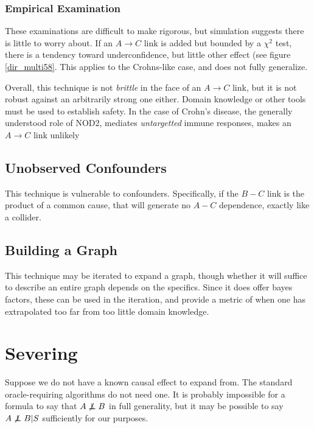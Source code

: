 \documentclass[twocolumn,12pt]{article}
\newcommand\indep{\protect\mathpalette{\protect\independenT}{\perp}}
\def\independenT#1#2{\mathrel{\rlap{$#1#2$}\mkern2mu{#1#2}}}
\begin{document}
\subsubsection{Empirical Examination}

These examinations are difficult to make rigorous, but simulation
suggests there is little to worry about.  If an $A\rightarrow C$ link
is added but bounded by a $\chi^2$ test, there is a tendency toward
underconfidence, but little other effect (see figure
\ref{dir_multi58}.  This applies to the Crohns-like case, and does not
fully generalize.

Overall, this technique is not \textit{brittle} in the face of an
$A \rightarrow C$ link, but it is not robust against an arbitrarily
strong one either.  Domain knowledge or other tools must be used to
establish safety.  In the case of Crohn's disease, the generally
understood role of NOD2, mediates \textit{untargetted} immune
responses,\cite{nod2} makes an $A\rightarrow C$ link unlikely

\subsection{Unobserved Confounders}

This technique is vulnerable to confounders.  Specifically, if the
$B-C$ link is the product of a common cause, that will generate no
$A-C$ dependence, exactly like a collider.

\subsection{Building a Graph}

This technique may be iterated to expand a graph, though whether it
will suffice to describe an entire graph depends on the specifics.
Since it does offer bayes factors, these can be used in the iteration,
and provide a metric of when one has extrapolated too far from too
little domain knowledge.

\section{Severing}

Suppose we do not have a known causal effect to expand from.  The
standard oracle-requiring algorithms do not need one.  It is probably
impossible for a formula to say that $A\not\indep B$ in full
generality, but it may be possible to say $A\not\indep B|S$
sufficiently for our purposes.
\end{document}
